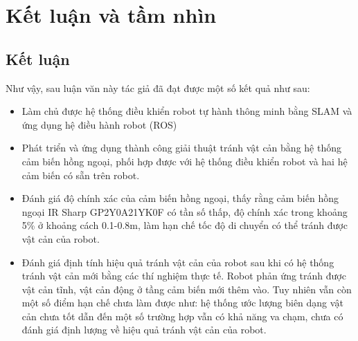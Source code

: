 
\chapter{Kết luận và tầm nhìn}
\label{chap:KetLuan}

\section{Kết luận}

Như vậy, sau luận văn này tác giả đã đạt được một số kết quả như sau:
\begin{itemize}
    \item Làm chủ được hệ thống điều khiển robot tự hành thông minh bằng SLAM và ứng dụng hệ điều hành robot (ROS)
    \item Phát triển và ứng dụng thành công giải thuật tránh vật cản bằng hệ thống cảm biến hồng ngoại, phối hợp được với hệ thống điều khiển robot và hai hệ cảm biến có sẵn trên robot.
    \item Đánh giá độ chính xác của cảm biến hồng ngoại, thấy rằng cảm biến hồng ngoại IR Sharp GP2Y0A21YK0F có tần số thấp, độ chính xác trong khoảng 5\% ở khoảng cách 0.1-0.8m, làm hạn chế tốc độ di chuyển có thể tránh được vật cản của robot.
    \item Đánh giá định tính hiệu quả tránh vật cản của robot sau khi có hệ thống tránh vật cản mới bằng các thí nghiệm thực tế. Robot phản ứng tránh được vật cản tĩnh, vật cản động ở tầng cảm biến mới thêm vào. Tuy nhiên vẫn còn một số điểm hạn chế chưa làm được như: hệ thống ước lượng biên dạng vật cản chưa tốt dẫn đến một số trường hợp vẫn có khả năng va chạm, chưa có đánh giá định lượng về hiệu quả tránh vật cản của robot.
\end{itemize}

